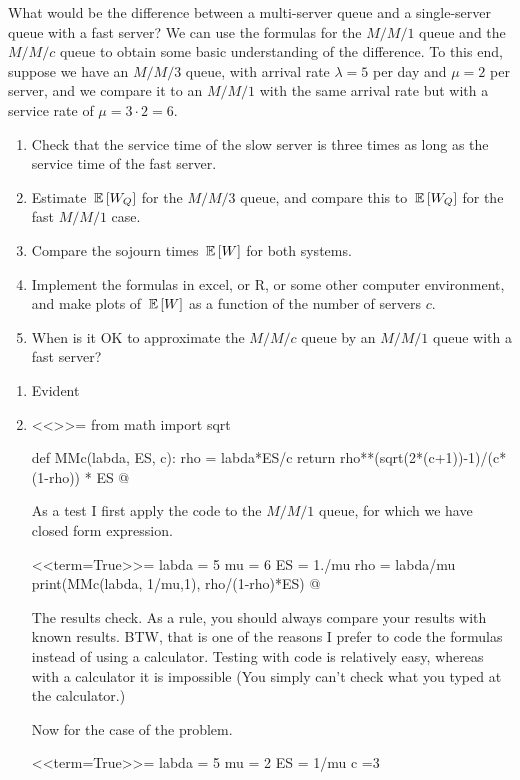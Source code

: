 \begin{question}
  What would be the difference between a multi-server queue and a
  single-server queue with a fast server? We can use the formulas for
  the $M/M/1$ queue and the $M/M/c$ queue to obtain some basic
  understanding of the difference. To this end, suppose we have an
  $M/M/3$ queue, with arrival rate $\lambda = 5$ per day and $\mu=2$
  per server, and we compare it to an $M/M/1$ with the same arrival
  rate but with a service rate of $\mu = 3\cdot 2 = 6$. 
  \begin{enumerate}
  \item Check that the service time of the slow server is three times
    as long as the service time of  the fast server.
  \item Estimate $\,\mathbb{E}\left[W_Q\right]$ for the $M/M/3$ queue, and compare this to
    $\,\mathbb{E}\left[W_Q\right]$ for the fast $M/M/1$ case.
  \item Compare the sojourn times $\,\mathbb{E}\left[W\right]$ for both systems.
  \item Implement the formulas in excel, or R, or some other computer
    environment, and make plots of $\,\mathbb{E}\left[W\right]$ as a function of the number
    of servers $c$. 
  \item When is it OK to approximate the $M/M/c$ queue by an $M/M/1$
    queue with a fast server?
  \end{enumerate}
  \begin{solution}
    \begin{enumerate}
    \item Evident
    \item 
<<>>=
from math import sqrt

def MMc(labda, ES, c):
    rho = labda*ES/c
    return  rho**(sqrt(2*(c+1))-1)/(c*(1-rho)) * ES
@

As a test I first apply the code to the $M/M/1$ queue, for which we have closed form expression.

<<term=True>>=
labda = 5
mu = 6
ES = 1./mu
rho = labda/mu
print(MMc(labda, 1/mu,1), rho/(1-rho)*ES)
@

The results check. As a rule, you should always compare your results
with known results. BTW, that is one of the reasons I prefer to code
the formulas instead of using a calculator. Testing with code is
relatively easy, whereas with a calculator it is impossible (You simply can't check what you typed at the calculator.)

Now for  the case of the problem.

<<term=True>>=
labda = 5
mu = 2
ES = 1/mu
c =3


\end{enumerate}
\end{solution}
\end{question}
